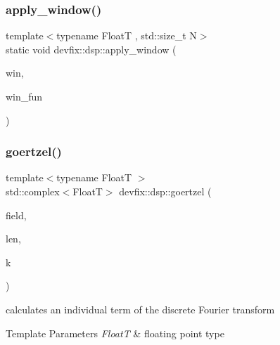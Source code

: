 \subsubsection{\texorpdfstring{apply\+\_\+window()}{apply\_window()}\hspace{0.1cm}{\footnotesize\ttfamily [6/6]}}
{\footnotesize\ttfamily template$<$typename FloatT , std\+::size\+\_\+t N$>$ \\
static void devfix\+::dsp\+::apply\+\_\+window (\begin{DoxyParamCaption}\item[{std\+::array$<$ std\+::complex$<$ FloatT $>$, N $>$ \&}]{win,  }\item[{\hyperlink{structdevfix_1_1dsp_1_1window_ab2d2c0c5f5fca6dbcf91895115b69eac}{window\+::win\+\_\+fun\+\_\+t}$<$ FloatT $>$}]{win\+\_\+fun }\end{DoxyParamCaption})\hspace{0.3cm}{\ttfamily [static]}}

\mbox{\label{namespacedevfix_1_1dsp_a5e776756816f3429899134f5c8b8b215}} 
\subsubsection{\texorpdfstring{goertzel()}{goertzel()}\hspace{0.1cm}{\footnotesize\ttfamily [1/3]}}
{\footnotesize\ttfamily template$<$typename FloatT $>$ \\
std\+::complex$<$FloatT$>$ devfix\+::dsp\+::goertzel (\begin{DoxyParamCaption}\item[{const std\+::complex$<$ FloatT $>$ $\ast$}]{field,  }\item[{std\+::size\+\_\+t}]{len,  }\item[{std\+::size\+\_\+t}]{k }\end{DoxyParamCaption})}



calculates an individual term of the discrete Fourier transform 


\begin{DoxyTemplParams}{Template Parameters}
{\em FloatT} & floating point type \\
\hline
\end{DoxyTemplParams}

